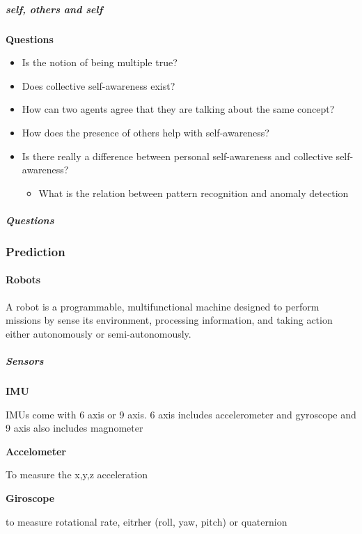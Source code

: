 \documentclass{book}
\providecommand{\ProjectDeepHeading}[2]{%
    \par\medskip\noindent\textbf{#2}\par\smallskip
}
\begin{document}
\subparagraph{self, others and self}
\textbf{Questions}
\begin{itemize}
    \item Is the notion of being multiple true?
    \item Does collective self-awareness exist?
    \item How can two agents agree that they are talking about the same concept?
    \item How does the presence of others help with self-awareness?
    \item Is there really a difference between personal self-awareness and collective self-awareness?
    \begin{itemize}
        \item What is the relation between pattern recognition and anomaly detection
    \end{itemize}
\end{itemize}


\subparagraph{Questions}


\subsubsection{Prediction}


\paragraph{Robots}
A robot is a programmable, multifunctional machine designed to perform missions by sense its environment, processing information, and taking action either autonomously or semi-autonomously.



\subparagraph{Sensors}
    \ProjectDeepHeading{1}{IMU}
        IMUs come with 6 axis or 9 axis. 6 axis includes accelerometer and gyroscope and 9 axis also includes magnometer
        
        \ProjectDeepHeading{2}{Accelometer}
            To measure the x,y,z acceleration
        
        \ProjectDeepHeading{2}{Giroscope}
            to measure rotational rate, eitrher (roll, yaw, pitch) or quaternion
        
\end{document}
